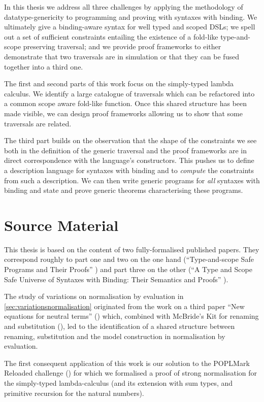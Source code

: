 In this thesis we address all three challenges by applying the methodology of
datatype-genericity to programming and proving with syntaxes with binding.
We ultimately give a binding-aware syntax for well typed and scoped DSLs; we
spell out a set of sufficient constraints entailing the existence of a fold-like
type-and-scope preserving traversal; and we provide proof frameworks
to either demonstrate that two traversals are in simulation or that they can be
fused together into a third one.

The first and second parts of this work focus on the simply-typed lambda calculus.
We identify a large catalogue of traversals which can be refactored into a common
scope aware fold-like function. Once this shared structure has been made
visible, we can design proof frameworks allowing us to show that some traversals
are related.

The third part builds on the observation that the shape of the constraints we
see both in the definition of the generic traversal and the proof frameworks
are in direct correspondence with the language's constructors. This pushes us
to define a description language for syntaxes with binding and to \emph{compute}
the constraints from such a description. We can then write generic programs for
\emph{all} syntaxes with binding and state and prove generic theorems characterising
these programs.

\section{Source Material}

This thesis is based on the content of two fully-formalised published papers. They
correspond roughly to part one and two on the one hand
(``Type-and-scope Safe Programs and Their Proofs'' \cite{allais2017type, repo2017})
and part three on the other
(``A Type and Scope Safe Universe of Syntaxes with Binding: Their Semantics and Proofs''
\cite{generic-syntax, repo2018}).

The study of variations on normalisation by evaluation in \cref{sec:variationsnormalisation}
originated from the work on a third paper ``New equations for neutral terms''
(\cite{new-equations}) which, combined with McBride's Kit for renaming and substitution
(\citeyear{mcbride2005type}), led to the identification of a shared structure between renaming,
substitution and the model construction in normalisation by evaluation.

The first consequent application of this work is our solution to the
POPLMark Reloaded challenge
(\cite{poplmarkreloaded, poplmark2}) for which we formalised a proof of
strong normalisation for the simply-typed lambda-calculus (and its extension
with sum types, and primitive recursion for the natural numbers).


